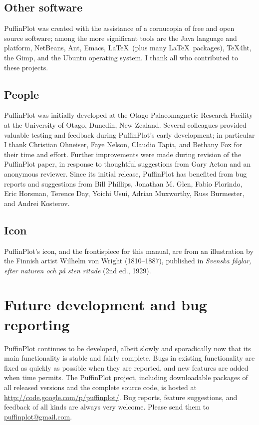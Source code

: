 \documentclass[a4paper,british]{article}
\begin{document}
\subsection*{Other software}

PuffinPlot was created with the assistance of a cornucopia of free and
open source software; among the more significant tools are the Java
language and platform, NetBeans, Ant, Emacs, \LaTeX\ (plus many
\LaTeX\ packages), TeX4ht, the Gimp, and the Ubuntu operating system. I
thank all who contributed to these projects.

\subsection*{People}

PuffinPlot was initially developed at the Otago Palaeomagnetic Research
Facility at the University of Otago, Dunedin, New Zealand. Several
colleagues provided valuable testing and feedback during PuffinPlot's
early development; in particular I thank Christian Ohneiser, Faye
Nelson, Claudio Tapia, and Bethany Fox for their time and effort.
Further improvements were made during revision of the PuffinPlot paper,
in response to thoughtful suggestions from Gary Acton and an anonymous
reviewer. Since its initial release, PuffinPlot has benefited from bug
reports and suggestions from Bill Phillips, Jonathan M. Glen, Fabio
Florindo, Eric Horsman, Terence Day, Yoichi Usui, Adrian Muxworthy,
Russ Burmester, and Andrei Kosterov.

\subsection*{Icon}

PuffinPlot's icon, and the frontispiece for this manual, are from an
illustration by the Finnish artist Wilhelm von Wright (1810--1887), published
in \emph{Svenska f\aa glar, efter naturen och p\aa{} sten ritade} (2nd ed.,
1929).


\section{Future development and bug reporting}

PuffinPlot continues to be developed, albeit slowly and sporadically now
that its main functionality is stable and fairly complete. Bugs in
existing functionality are fixed as quickly as possible when they are
reported, and new features are added when time permits. The PuffinPlot
project, including downloadable packages of all released versions and
the complete source code, is hosted at
\url{http://code.google.com/p/puffinplot/}. Bug reports, feature
suggestions, and feedback of all kinds are always very welcome. Please
send them to
\textsf{\href{mailto:puffinplot@gmail.com}{puffinplot@gmail.com}}.
\end{document}

